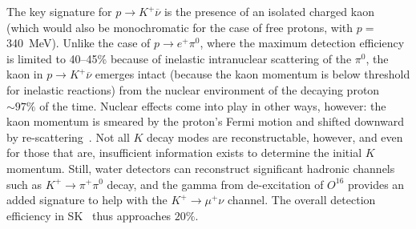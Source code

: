 The key signature for $p\to K^+\overline{\nu}$ is the presence of an
isolated charged kaon (which would also be monochromatic 
for the case of free protons, with $p=$\SI{340}{\MeV}).  
Unlike the case of $p\to e^+\pi^0$, where the maximum
detection efficiency is limited to 40--45\% because of inelastic
intranuclear scattering of the $\pi^0$, the kaon in $p\to
K^+\overline{\nu}$ emerges intact (because the kaon momentum is 
below threshold for inelastic reactions)
from the nuclear environment of the decaying proton $\sim 97\%$ of the
time.  Nuclear effects come into play in other ways, however: the kaon
momentum is smeared by the proton's Fermi motion and shifted downward
by re-scattering~\cite{Stefan:2008zi}. 
Not all $K$ decay modes are reconstructable, however,
and even for those that are, insufficient information exists to
determine the initial $K$ momentum.  Still, water detectors can
reconstruct significant hadronic channels such as $K^+\to\pi^+\pi^0$
decay, and the  gamma from de-excitation of $O^{16}$ provides an
added signature to help with the $K^+\to\mu^+\nu$ channel. The overall
detection efficiency in SK~\cite{kearns_isoups} thus approaches
$20\%$.

